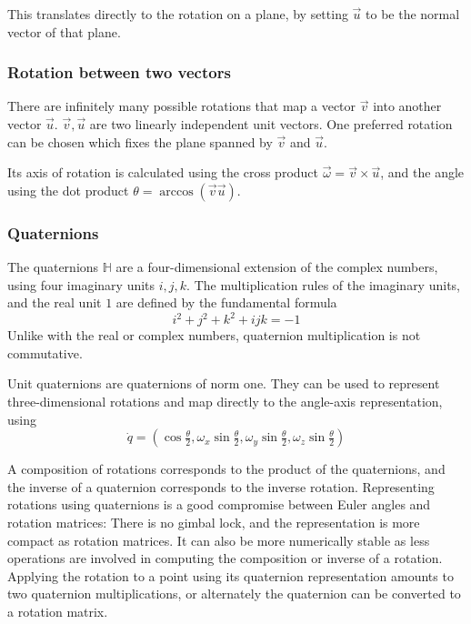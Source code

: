 This translates directly to the rotation on a plane, by setting $\vec{u}$ to be the normal vector of that plane.


\subsubsection{Rotation between two vectors}
There are infinitely many possible rotations that map a vector $\vec{v}$ into another vector $\vec{u}$. $\vec{v}, \vec{u}$ are two linearly independent unit vectors. One preferred rotation can be chosen which fixes the plane spanned by $\vec{v}$ and $\vec{u}$.

Its axis of rotation is calculated using the cross product $\vec{\omega} = \vec{v} \times \vec{u}$, and the angle using the dot product $\theta = \arccos (\vec{v} \vec{u})$.


\subsubsection{Quaternions}
The quaternions $\mathbb{H}$ are a four-dimensional extension of the complex numbers, using four imaginary units $i, j, k$. The multiplication rules of the imaginary units, and the real unit $1$ are defined by the fundamental formula
\begin{equation}
i^2 + j^2 + k^2 + i j k = -1
\end{equation}
Unlike with the real or complex numbers, quaternion multiplication is not commutative.

Unit quaternions are quaternions of norm one. They can be used to represent three-dimensional rotations and map directly to the angle-axis representation, using
\begin{equation}
\dot{q} = \left( \cos \tfrac{\theta}{2}, \omega_x \sin \tfrac{\theta}{2}, \omega_y \sin \tfrac{\theta}{2}, \omega_z \sin \tfrac{\theta}{2} \right)
\end{equation}

A composition of rotations corresponds to the product of the quaternions, and the inverse of a quaternion corresponds to the inverse rotation. Representing rotations using quaternions is a good compromise between Euler angles and rotation matrices: There is no gimbal lock, and the representation is more compact as rotation matrices. It can also be more numerically stable as less operations are involved in computing the composition or inverse of a rotation. Applying the rotation to a point using its quaternion representation amounts to two quaternion multiplications, or alternately the quaternion can be converted to a rotation matrix.


